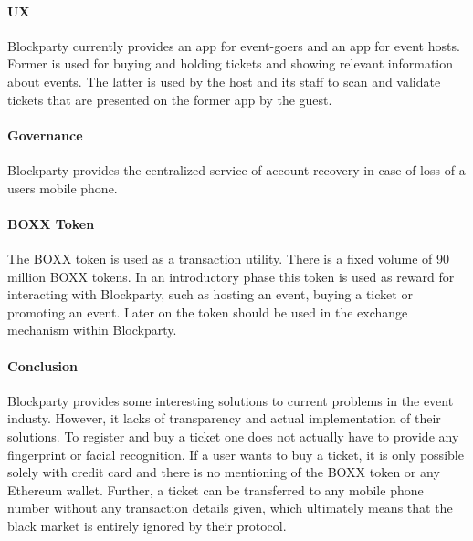 \paragraph{UX} Blockparty currently provides an app for event-goers and an app for event hosts. Former is used for buying and holding tickets and showing relevant information about events. The latter is used by the host and its staff to scan and validate tickets that are presented on the former app by the guest.

\paragraph{Governance} Blockparty provides the centralized service of account recovery in case of loss of a users mobile phone.

\paragraph{BOXX Token} The BOXX token is used as a transaction utility. There is a fixed volume of 90 million BOXX tokens. In an introductory phase this token is used as reward for interacting with Blockparty, such as hosting an event, buying a ticket or promoting an event. Later on the token should be used in the exchange mechanism within Blockparty.

\paragraph{Conclusion} Blockparty provides some interesting solutions to current problems in the event industy. However, it lacks of transparency and actual implementation of their solutions. To register and buy a ticket one does not actually have to provide any fingerprint or facial recognition. If a user wants to buy a ticket, it is only possible solely with credit card and there is no mentioning of the BOXX token or any Ethereum wallet. Further, a ticket can be transferred to any mobile phone number without any transaction details given, which ultimately means that the black market is entirely ignored by their protocol.
